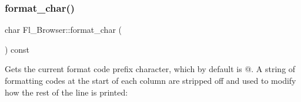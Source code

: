 \mbox{\label{class_fl___browser_a129dca59d64baf166503ba59341add69}} 
\subsubsection{\texorpdfstring{format\+\_\+char()}{format\_char()}\hspace{0.1cm}{\footnotesize\ttfamily [1/2]}}
{\footnotesize\ttfamily char Fl\+\_\+\+Browser\+::format\+\_\+char (\begin{DoxyParamCaption}{ }\end{DoxyParamCaption}) const\hspace{0.3cm}{\ttfamily [inline]}}

Gets the current format code prefix character, which by default is \textquotesingle{}@\textquotesingle{}. A string of formatting codes at the start of each column are stripped off and used to modify how the rest of the line is printed\+:

